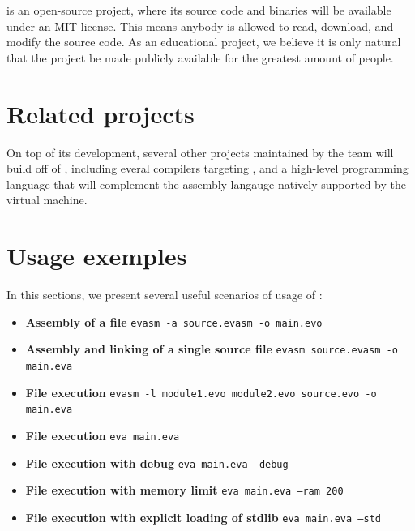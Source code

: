 \documentclass[11pt,twoside]{article}
\begin{document}
 is an open-source project, where its source code and binaries will be available under an MIT license. This means anybody is allowed to read, download, and modify the source code. As an educational project, we believe it is only natural that the project be made publicly available for the greatest amount of people.

\section{Related projects}

On top of its development, several other projects maintained by the team will build off of , including everal compilers targeting , and a high-level programming language that will complement the assembly langauge natively supported by the virtual machine.

\section{Usage exemples}

In this sections, we present several useful scenarios of usage of :

\begin{itemize}
  \item \textbf{Assembly of a file} \texttt{evasm -a source.evasm -o main.evo}
  \item \textbf{Assembly and linking of a single source file} \texttt{evasm source.evasm -o main.eva}
  \item \textbf{File execution} \texttt{evasm -l module1.evo module2.evo source.evo -o main.eva}
  \item \textbf{File execution} \texttt{eva main.eva}
  \item \textbf{File execution with debug} \texttt{eva main.eva --debug}
  \item \textbf{File execution with memory limit} \texttt{eva main.eva --ram 200}
  \item \textbf{File execution with explicit loading of stdlib} \texttt{eva main.eva --std}
\end{itemize}

\cleardoublepage


\end{document}
